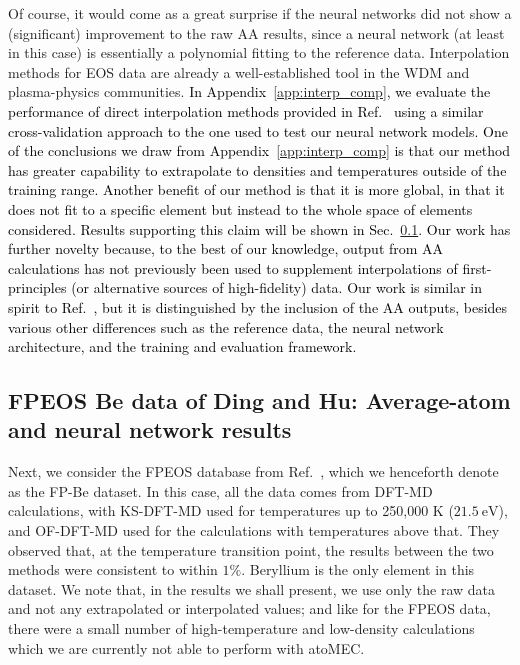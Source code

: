 \documentclass[%
 preprint,
 superscriptaddress,
 amsmath,amssymb,
longbibliography,
]{revtex4-2}
\newcommand{\change}[1]{\textcolor{black}{#1}}
\begin{document}
Of course, it would come as a great surprise if the neural networks did not show a (significant) improvement to the raw AA results, since a neural network (at least in this case) is essentially a polynomial fitting to the reference data. Interpolation methods for EOS data are already a well-established tool in the WDM and plasma-physics communities. \change{In Appendix~\ref{app:interp_comp}, we evaluate the performance of direct interpolation methods provided in Ref.~\onlinecite{Militzer_EOS_database} using a similar cross-validation approach to the one used to test our neural network models. One of the conclusions we draw from Appendix~\ref{app:interp_comp} is that our method has greater capability to extrapolate to densities and temperatures outside of the training range. Another benefit of our method is that it is more global, in that it does not fit to a specific element but instead to the whole space of elements considered. Results supporting this claim will be shown in Sec.~\ref{sec:results_nn_Be}. Our work has further novelty because, to the best of our knowledge, output from AA calculations has not previously been used to supplement interpolations of first-principles (or alternative sources of high-fidelity) data. Our work is similar in spirit to Ref.~\cite{Mentzer_EOS_neural}, but it is distinguished by the inclusion of the AA outputs, besides various other differences such as the reference data, the neural network architecture, and the training and evaluation framework.}



\subsection{FPEOS Be data of Ding and Hu: Average-atom and neural network results}\label{sec:results_nn_Be}

Next, we consider the FPEOS database from Ref.~\cite{Hu_Be_EOS}, which we henceforth denote as the FP-Be dataset. In this case, all the data comes from DFT-MD calculations, with KS-DFT-MD used for temperatures up to 250,000 K ($21.5\ \textrm{eV}$), and OF-DFT-MD used for the calculations with temperatures above that. They observed that, at the temperature transition point, the results between the two methods were consistent to within $1\%$. Beryllium is the only element in this dataset. We note that, in the results we shall present, we use only the raw data and not any extrapolated or interpolated values; and like for the FPEOS data, there were a small number of high-temperature and low-density calculations which we are currently not able to perform with atoMEC.
\end{document}
